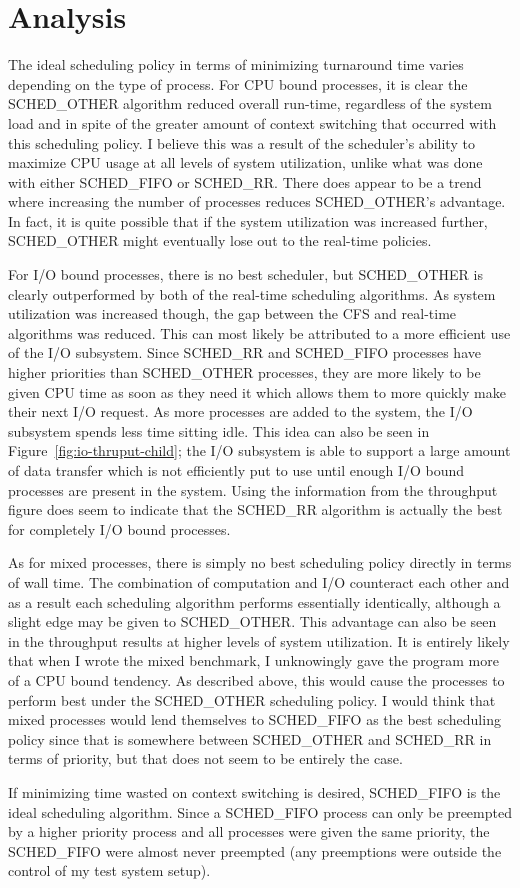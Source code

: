 ﻿\section{Analysis}

The ideal scheduling policy in terms of minimizing turnaround time varies depending on the type of process.  For CPU bound processes, it is clear the SCHED\_OTHER algorithm reduced overall run-time, regardless of the system load and in spite of the greater amount of context switching that occurred with this scheduling policy.  I believe this was a result of the scheduler's ability to maximize CPU usage at all levels of system utilization, unlike what was done with either SCHED\_FIFO or SCHED\_RR.  There does appear to be a trend where increasing the number of processes reduces SCHED\_OTHER's advantage.  In fact, it is quite possible that if the system utilization was increased further, SCHED\_OTHER might eventually lose out to the real-time policies.

For I/O bound processes, there is no best scheduler, but SCHED\_OTHER is clearly outperformed by both of the real-time scheduling algorithms.  As system utilization was increased though, the gap between the CFS and real-time algorithms was reduced.  This can most likely be attributed to a more efficient use of the I/O subsystem.  Since SCHED\_RR and SCHED\_FIFO processes have higher priorities than SCHED\_OTHER processes, they are more likely to be given CPU time as soon as they need it which allows them to more quickly make their next I/O request.  As more processes are added to the system, the I/O subsystem spends less time sitting idle.  This idea can also be seen in Figure~\ref{fig:io-thruput-child}; the I/O subsystem is able to support a large amount of data transfer which is not efficiently put to use until enough I/O bound processes are present in the system.  Using the information from the throughput figure does seem to indicate that the SCHED\_RR algorithm is actually the best for completely I/O bound processes.

As for mixed processes, there is simply no best scheduling policy directly in terms of wall time.  The combination of computation and I/O counteract each other and as a result each scheduling algorithm performs essentially identically, although a slight edge may be given to SCHED\_OTHER.  This advantage can also be seen in the throughput results at higher levels of system utilization.  It is entirely likely that when I wrote the mixed benchmark, I unknowingly gave the program more of a CPU bound tendency.  As described above, this would cause the processes to perform best under the SCHED\_OTHER scheduling policy.  I would think that mixed processes would lend themselves to SCHED\_FIFO as the best scheduling policy since that is somewhere between SCHED\_OTHER and SCHED\_RR in terms of priority, but that does not seem to be entirely the case.  

If minimizing time wasted on context switching is desired, SCHED\_FIFO is the ideal scheduling algorithm.  Since a SCHED\_FIFO process can only be preempted by a higher priority process and all processes were given the same priority, the SCHED\_FIFO were almost never preempted (any preemptions were outside the control of my test system setup).
